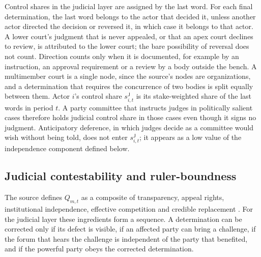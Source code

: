 \documentclass[11pt,letterpaper]{article}
\theoremstyle{definition}
\theoremstyle{remark}
\newcommand{\pJ}{\mathsf{J}}
\begin{document}
Control shares in the judicial layer are assigned by the last word. For each final determination, the last word belongs to the actor that decided it, unless another actor directed the decision or reversed it, in which case it belongs to that actor. A lower court's judgment that is never appealed, or that an apex court declines to review, is attributed to the lower court; the bare possibility of reversal does not count. Direction counts only when it is documented, for example by an instruction, an approval requirement or a review by a body outside the bench. A multimember court is a single node, since the source's nodes are organizations, and a determination that requires the concurrence of two bodies is split equally between them. Actor $i$'s control share $s^{\pJ}_{i,t}$ is its stake-weighted share of the last words in period $t$. A party committee that instructs judges in politically salient cases therefore holds judicial control share in those cases even though it signs no judgment. Anticipatory deference, in which judges decide as a committee would wish without being told, does not enter $s^{\pJ}_{i,t}$; it appears as a low value of the independence component defined below.

\subsection{Judicial contestability and ruler-boundness}

The source defines $Q_{m,t}$ as a composite of transparency, appeal rights, institutional independence, effective competition and credible replacement \citep{largo2026hbs}. For the judicial layer these ingredients form a sequence. A determination can be corrected only if its defect is visible, if an affected party can bring a challenge, if the forum that hears the challenge is independent of the party that benefited, and if the powerful party obeys the corrected determination.
\end{document}
